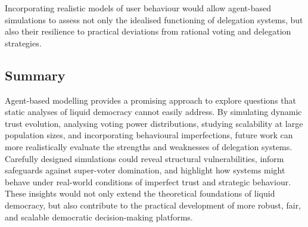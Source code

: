 Incorporating realistic models of user behaviour would allow agent-based simulations to assess not only the idealised functioning of delegation systems, but also their resilience to practical deviations from rational voting and delegation strategies.

\subsection{Summary}

Agent-based modelling provides a promising approach to explore questions that static analyses of liquid democracy cannot easily address. By simulating dynamic trust evolution, analysing voting power distributions, studying scalability at large population sizes, and incorporating behavioural imperfections, future work can more realistically evaluate the strengths and weaknesses of delegation systems. Carefully designed simulations could reveal structural vulnerabilities, inform safeguards against super-voter domination, and highlight how systems might behave under real-world conditions of imperfect trust and strategic behaviour. These insights would not only extend the theoretical foundations of liquid democracy, but also contribute to the practical development of more robust, fair, and scalable democratic decision-making platforms.






